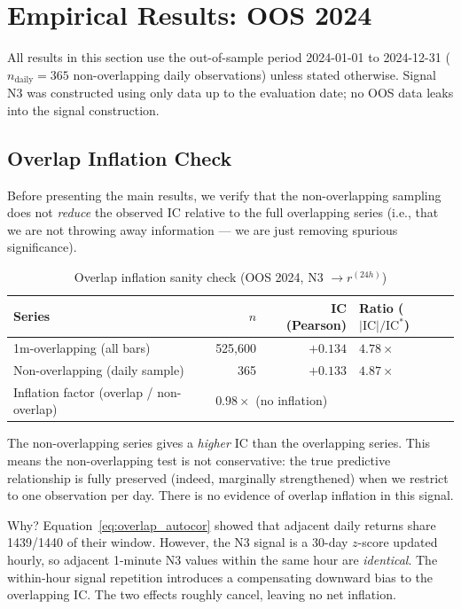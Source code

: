 \documentclass[12pt, a4paper]{article}
\theoremstyle{plain}
\theoremstyle{definition}
\newcommand{\IC}{\mathrm{IC}}
\begin{document}
\section{Empirical Results: OOS 2024}
\label{sec:results}

All results in this section use the out-of-sample period
2024-01-01 to 2024-12-31 ($n_{\text{daily}} = 365$ non-overlapping
daily observations) unless stated otherwise. Signal N3 was constructed
using only data up to the evaluation date; no OOS data leaks into the
signal construction.

\subsection{Overlap Inflation Check}

Before presenting the main results, we verify that the non-overlapping
sampling does not \emph{reduce} the observed IC relative to the full
overlapping series (i.e., that we are not throwing away information ---
we are just removing spurious significance).

\begin{table}[H]
\centering
\caption{Overlap inflation sanity check (OOS 2024, N3 $\to r^{(24h)}$)}
\label{tab:overlap}
\begin{tabular}{lrrl}
\toprule
Series & $n$ & IC (Pearson) & Ratio ($|\IC|/\IC^*$) \\
\midrule
1m-overlapping (all bars)      & 525,600 & $+0.134$ & $4.78\times$ \\
Non-overlapping (daily sample) & 365     & $+0.133$ & $4.87\times$ \\
\midrule
Inflation factor (overlap / non-overlap) & \multicolumn{3}{l}{$0.98\times$ (no inflation)} \\
\bottomrule
\end{tabular}
\end{table}

The non-overlapping series gives a \emph{higher} IC than the overlapping
series. This means the non-overlapping test is not conservative: the true
predictive relationship is fully preserved (indeed, marginally strengthened)
when we restrict to one observation per day. There is no evidence of
overlap inflation in this signal.

Why? Equation~\eqref{eq:overlap_autocor} showed that adjacent daily returns
share 1439/1440 of their window. However, the N3 signal is a 30-day
$z$-score updated hourly, so adjacent 1-minute N3 values within the same
hour are \emph{identical}. The within-hour signal repetition introduces a
compensating downward bias to the overlapping IC. The two effects roughly
cancel, leaving no net inflation.
\end{document}
